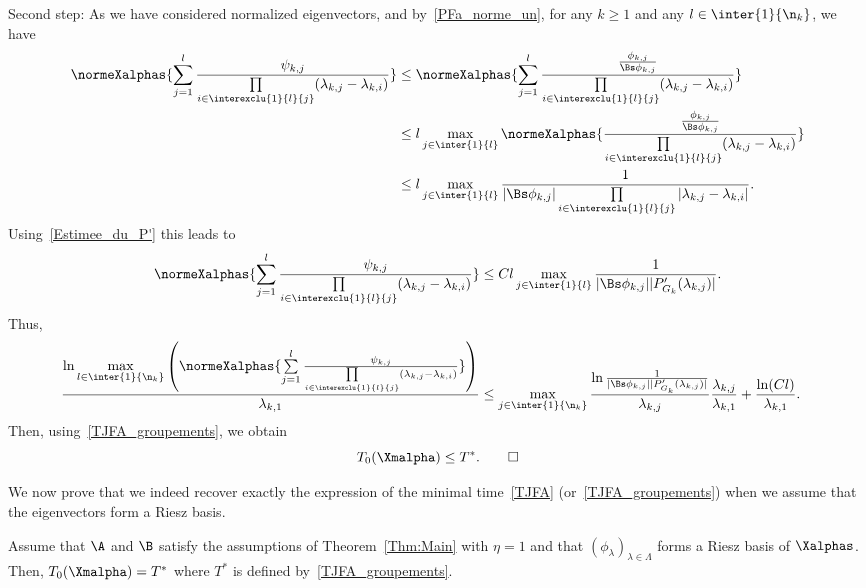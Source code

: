 \begin{proofc}
\begin{step}{Second step:}
As we have considered normalized eigenvectors, and by~\eqref{PFa_norme_un}, for any $k \geq 1$ and any $l\in \inter{1}{\n_k}$, we have
\begin{align*}
\normeXalphas{ \sum\limits_{j=1}^l \frac{ \psi_{k,j} }{\prod\limits_{i\in \interexclu{1}{l}{j}} (\lambda_{k,j}-\lambda_{k,i})} } & \leq \normeXalphas{ \sum\limits_{j=1}^l \frac{ \frac{\phi_{k,j}}{\Bs \phi_{k,j}}}{\prod\limits_{i\in \interexclu{1}{l}{j}} (\lambda_{k,j}-\lambda_{k,i})} }
\\
&\leq l\max\limits_{j\in \inter{1}{l}} \normeXalphas{ \frac{ \frac{\phi_{k,j}}{\Bs \phi_{k,j}}}{\prod\limits_{i\in \interexclu{1}{l}{j}} (\lambda_{k,j}-\lambda_{k,i})} }
\\
&\leq l \max_{j\in \inter{1}{l}} \frac{1}{ | \Bs \phi_{k,j} | \prod\limits_{i\in \interexclu{1}{l}{j}}|\lambda_{k,j}-\lambda_{k,i} |}.
\end{align*}
Using~\eqref{Estimee_du_P'} this leads to
\begin{equation*}
\normeXalphas{ \sum\limits_{j=1}^l \frac{ \psi_{k,j} }{\prod\limits_{i\in \interexclu{1}{l}{j}} (\lambda_{k,j}-\lambda_{k,i})} }
\leq Cl \max_{j\in \inter{1}{l}} \frac{1}{ | \Bs \phi_{k,j} | | P_{G_k}'(\lambda_{k,j}) | }.
\end{equation*}
Thus,
\begin{align*}
\frac{\ln \max\limits_{l\in\inter{1}{\n_k}} \left(
\normeXalphas{ \sum\limits_{j=1}^l \frac{ \psi_{k,j} }{\prod\limits_{i\in \interexclu{1}{l}{j}} (\lambda_{k,j}-\lambda_{k,i})} }
\right) }{\lambda_{k,1}} &\leq \max_{j\in \inter{1}{\n_k}} \frac{\ln \frac{1}{ | \Bs \phi_{k,j} | | P_{G_k}'(\lambda_{k,j}) | }}{ \lambda _{k,j} } \frac{\lambda_{k,j}}{\lambda_{k,1} }+ \frac{\ln(C l)}{\lambda_{k,1}}.
\end{align*}
Then, using~\eqref{TJFA_groupements}, we obtain
\[
T_{0}(\Xmalpha)\leq T^*.\qedhere
\]
\end{step}\let\qed\relax
\end{proofc}


We now prove that we indeed recover exactly the expression of the minimal time~\eqref{TJFA} (or~\eqref{TJFA_groupements}) when we assume that the eigenvectors form a Riesz basis.

\begin{prop}\label{Prop:T_0>T*}
Assume that $\A$ and $\B$ satisfy the assumptions of Theorem~\ref{Thm:Main} with $\eta=1$ and that $(\phi_\lambda)_{\lambda\in \Lambda}$ forms a Riesz basis of $\Xalphas$. Then, $T_0(\Xmalpha)=T^*$ where $T^*$ is defined by~\eqref{TJFA_groupements}.
\end{prop}

